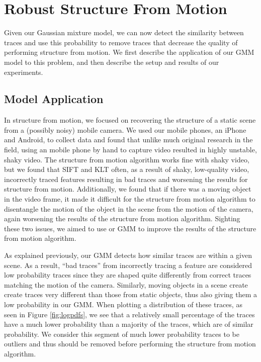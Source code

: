 \section{Robust Structure From Motion}
\label{sec:sfm}

Given our Gaussian mixture model, we can now detect the similarity between
traces and use this probability to remove traces that decrease the quality of
performing structure from motion.  We first describe the application of our GMM
model to this problem, and then describe the setup and results of our
experiments.

\subsection{Model Application} %
\label{sub:Model Application}

In structure from motion, we focused on recovering the structure of a
static scene from a (possibly noisy) mobile camera.  We used our mobile phones,
an iPhone and Android, to collect data and found that unlike much original
research in the field, using an mobile phone by hand to capture video resulted
in highly unstable, shaky video.  The structure from motion algorithm works
fine with shaky video, but we found that SIFT and KLT often, as a result of
shaky, low-quality video, incorrectly traced features resulting in bad traces
and worsening the results for structure from motion.  Additionally, we found
that if there was a moving object in the video frame, it made it difficult for
the structure from motion algorithm to disentangle the motion of the object in
the scene from the motion of the camera, again worsening the results of the
structure from motion algorithm.  Sighting these two issues, we aimed to use or
GMM to improve the results of the structure from motion algorithm.

As explained previously, our GMM detects how similar traces are within a given
scene.  As a result, ``bad traces'' from incorrectly tracing a feature are
considered low probability traces since they are shaped quite differently from
correct traces matching the motion of the camera.  Similarly, moving objects in
a scene create create traces very different than those from static objects,
thus also giving them a low probability in our GMM.  When plotting a
distribution of these traces, as seen in Figure \ref{fig:logpdfs}, we see that
a relatively small percentage of the traces have a much lower probability than
a majority of the traces, which are of similar probability.  We consider this
segment of much lower probability traces to be outliers and thus should be
removed before performing the structure from motion algorithm.

